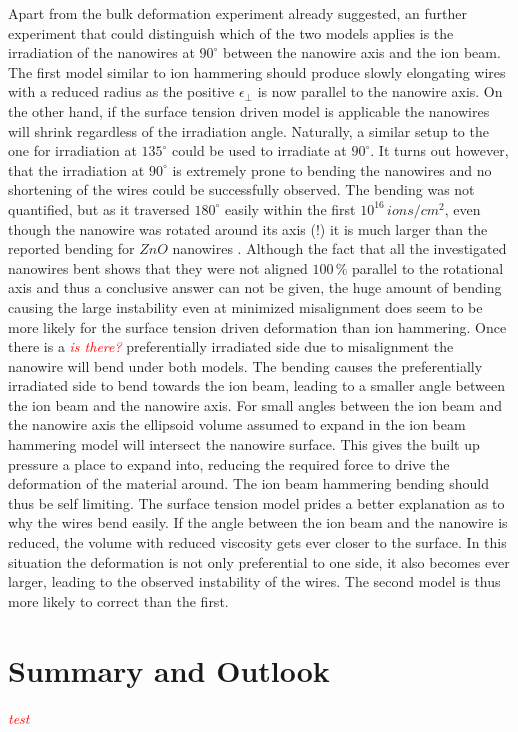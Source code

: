 \documentclass[12pt,
paper=a4,				
DIV=calc,		  %
BCOR=16mm,	  %
headinclude,
openany
]{scrbook}
\newcommand{\TODO}[1]{{\LARGE{\textcolor{red}{\emph {#1 }}}}}
\begin{document}
Apart from the bulk deformation experiment already suggested, an further experiment that could distinguish which of the two models applies is the irradiation of the nanowires at $90^\circ$ between the nanowire axis and the ion beam. The first model similar to ion hammering should produce slowly elongating wires with a reduced radius as the positive $\epsilon_{\perp}$ is now parallel to the nanowire axis. On the other hand, if the surface tension driven model is applicable the nanowires will shrink regardless of the irradiation angle. Naturally, a similar setup to the one for irradiation at $135^\circ$ could be used to irradiate at $90^\circ$. It turns out however, that the irradiation at $90^\circ$ is extremely prone to bending the nanowires and no shortening of the wires could be successfully observed. The bending was not quantified, but as it traversed $180^\circ$ easily within the first $10^{16}\,ions/cm^2$, even though the nanowire was rotated around its axis (!) it is much larger than the reported bending for $ZnO$ nanowires \cite{borschel_permanent_2011}. Although the fact that all the investigated nanowires bent shows that they were not aligned $100\,\%$ parallel to the rotational axis and thus a conclusive answer can not be given, the huge amount of bending causing the large instability even at minimized misalignment does seem to be more likely for the surface tension driven deformation than ion hammering. Once there is a \TODO{is there?} preferentially irradiated side due to misalignment the nanowire will bend under both models. The bending causes the preferentially irradiated side to bend towards the ion beam, leading to a smaller angle between the ion beam and the nanowire axis. For small angles between the ion beam and the nanowire axis the ellipsoid volume assumed to expand in the ion beam hammering model will intersect the nanowire surface. This gives the built up pressure a place to expand into, reducing the required force to drive the deformation of the material around. The ion beam hammering bending should thus be self limiting. The surface tension model prides a better explanation as to why the wires bend easily. If the angle between the ion beam and the nanowire is reduced, the volume with reduced viscosity gets ever closer to the surface. In this situation the deformation is not only preferential to one side, it also becomes ever larger, leading to the observed instability of the wires. The second model is thus more likely to correct than the first.


\chapter{Summary and Outlook}


\TODO{test}



\end{document}
